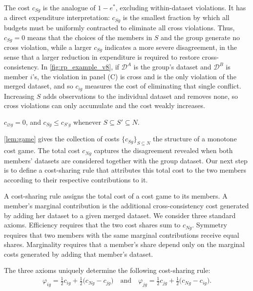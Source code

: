 \documentclass[11 pt]{article}
\begin{document}
The cost $c_{Sg}$ is the analogue of $1 - e^{*}$, excluding within-dataset violations. It has a direct expenditure interpretation: $c_{Sg}$ is the smallest fraction by which all budgets must be uniformly contracted to eliminate all cross violations. Thus, $c_{Sg} = 0$ means that the choices of the members in $S$ and the group generate no cross violation, while a larger $c_{Sg}$ indicates a more severe disagreement, in the sense that a larger reduction in expenditure is required to restore cross-consistency. In \autoref{fig:rp_example_v8}, if $\mathcal{D}^{A}$ is the group's dataset and $\mathcal{D}^{B}$ is member $i$'s, the violation in panel (C) is cross and is the only violation of the merged dataset, and so $c_{ig}$ measures the cost of eliminating that single conflict. Increasing $S$ adds observations to the individual dataset and removes none, so cross violations can only accumulate and the cost weakly increases.

\begin{lemma}\label{lem:game}
$c_{\varnothing g} = 0$, and $c_{Sg} \leq c_{S'g}$ whenever $S \subseteq S' \subseteq N$.
\end{lemma}

\autoref{lem:game} gives the collection of costs $\{c_{Sg}\}_{S \subseteq N}$ the structure of a monotone cost game. The total cost $c_{Ng}$ captures the disagreement revealed when both members' datasets are considered together with the group dataset. Our next step is to define a cost-sharing rule that attributes this total cost to the two members according to their respective contributions to it.

A cost-sharing rule assigns the total cost of a cost game to its members. A member's marginal contribution is the additional cross-consistency cost generated by adding her dataset to a given merged dataset. We consider three standard axioms. Efficiency requires that the two cost shares sum to $c_{Ng}$. Symmetry requires that two members with the same marginal contributions receive equal shares. Marginality requires that a member's share depend only on the marginal costs generated by adding that member's dataset.

\begin{proposition}\label{prop:shapley}
The three axioms uniquely determine the following cost-sharing rule:
\begin{align*}
\varphi_{ig} = \tfrac{1}{2} c_{ig} + \tfrac{1}{2}\bigl( c_{Ng} - c_{jg} \bigr) \quad \text{and} \quad \varphi_{jg} = \tfrac{1}{2} c_{jg} + \tfrac{1}{2}\bigl( c_{Ng} - c_{ig} \bigr).
\end{align*}
\end{proposition}
\end{document}
